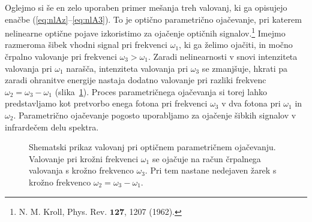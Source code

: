 Oglejmo si še en zelo uporaben primer mešanja treh valovanj, 
ki ga opisujejo enačbe (\ref{eq:nlAz}--\ref{eq:nlA3}). To je
optično parametrično ojačevanje, pri katerem nelinearne optične pojave
izkoristimo za ojačenje optičnih signalov.\footnote{N. M. Kroll, Phys. Rev. $\mathbf{127}$, 1207 (1962).}
Imejmo razmeroma šibek vhodni
signal pri frekvenci $\omega_{1}$, ki ga želimo ojačiti, in močno črpalno valovanje
pri frekvenci $\omega_{3}>\omega_{1}$. Zaradi nelinearnosti v snovi  
intenziteta valovanja pri $\omega_{1}$ narašča, 
intenziteta valovanja pri $\omega_{3}$ se zmanjšuje, hkrati pa zaradi
ohranitve energije nastaja dodatno valovanje pri razliki frekvenc
$\omega_{2}=\omega_{3}-\omega_{1}$ (slika~\ref{fig:opa2}). Proces parametričnega ojačevanja 
si torej lahko predstavljamo kot pretvorbo enega fotona pri frekvenci 
$\omega_{3}$ v dva fotona pri $\omega_{1}$ in $\omega_{2}$.
Parametrično ojačevanje pogosto uporabljamo za ojačenje šibkih signalov 
v infrardečem delu spektra.
\begin{figure}[h]
\centering
\def\svgwidth{70truemm} 

\caption{Shematski prikaz valovanj pri optičnem parametričnem ojačevanju. Valovanje
pri krožni frekvenci $\omega_1$ se ojačuje na račun črpalnega valovanja s krožno frekvenco
$\omega_3$. Pri tem nastane nedejaven žarek s krožno frekvenco $\omega_2 =  \omega_3-\omega_1$.}
\label{fig:opa2}
\end{figure}

